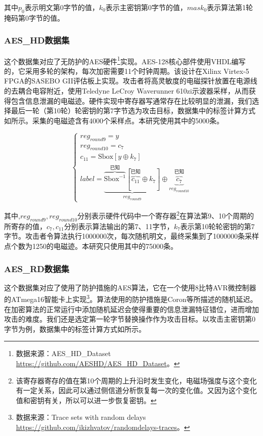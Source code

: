 {	\noindent 其中$p_0$表示明文第0字节的值，$k_0$表示主密钥第0字节的值，$mask_0$表示算法第1轮掩码第0字节的值。
	
	\subsubsection{AES\_HD数据集}
	这个数据集对应了无防护的AES硬件\footnote{数据来源：AES\_HD\_Dataset \href{https://github.com/AESHD/AES\_HD\_Dataset}{https://github.com/AESHD/AES\_HD\_Dataset}。}实现。AES-128核心部件使用VHDL编写的，它采用多轮的架构，每次加密需要11个时钟周期。该设计在Xilinx Virtex-5 FPGA的SASEBO GII评估板上实现。攻击者将高灵敏度的电磁探针放置在电源线的去耦合电容附近，使用Teledyne LeCroy Waverunner 610zi示波器采样，从而获得包含信息泄漏的电磁迹。硬件实现中寄存器写通常存在比较明显的泄漏，我们选择最后一轮（第10轮）轮密钥的第7字节选为攻击目标，数据集中的标签计算方式如所示。采集的电磁迹含有4000个采样点。本研究使用其中的5000条。
	
	\begin{equation}
		\begin{cases}
			reg_{round9}=y\\
			reg_{round10}=c_{7}\\
			c_{11}=\mathrm{Sbox}[y\oplus k_7]\\
			label =\underbrace{\overbrace{\mathrm{Sbox}^{-1}}^{\mbox{已知}}[\overbrace{c_{11}}^{\mbox{已知}}\oplus k_{7}]}_{reg_{round9}}\oplus \underbrace{\overbrace{c_{7}}^{\mbox{已知}}}_{reg_{round10}}
		\end{cases}\label{eq:aeshdmodel}
	\end{equation}
	
	\noindent 其中,$reg_{round9},reg_{round10}$分别表示硬件代码中一个寄存器\footnote{该寄存器寄存的值在第10个周期的上升沿时发生变化，电磁场强度与这个变化有一定关系，因此可以通过侧信道分析恢复每一次的变化值。又因为这个变化值和密钥有关，所以可以进一步恢复密钥。}在算法第9、10个周期的所寄存的值，$c_7,c_{11}$分别表示算法输出的第7、11字节，$k_7$表示第10轮轮密钥的第7字节。攻击者令算法执行1000000次，每次随机明文，最终采集到了1000000条采样点个数为1250的电磁迹。本研究只使用其中的75000条。
	
	\subsubsection{AES\_RD数据集}
	这个数据集对应了使用了防护措施的AES算法，它在一个使用8比特AVR微控制器的ATmega16智能卡上实现\footnote{数据来源：Trace sets with random delays \href{https://github.com/ikizhvatov/randomdelays-traces}{https://github.com/ikizhvatov/randomdelays-traces}。}。算法使用的防护措施是Coron等\citep{Coron09}所描述的随机延迟。在加密算法的正常运行中添加随机延迟会使得重要的信息泄漏特征错位，进而增加攻击的难度。我们还是选定第一轮字节替换操作作为攻击目标。以攻击主密钥第0字节为例，数据集中的标签计算方式如所示。
	
}
